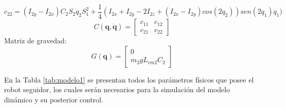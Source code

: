 \begin{equation}
    c_{22}=(I_{2y}-I_{2x} ) C_2 S_2 \Dot{q}_2 S_1^2+ \frac{1}{4} (I_{2x}+I_{2y}-2I_{2z}+(I_{2x}-I_{2y} )cos(2q_2 ) )sen(2q_1)\Dot{q}_1 )
\end{equation}
\begin{equation} \label{eq:modelo3}
    C(\textbf{q},\Dot{\textbf{q}})=
    \begin{bmatrix}
        c_{11} & c_{12} \\
        c_{21} & c_{22} 
    \end{bmatrix}
\end{equation}
Matriz de gravedad:
\begin{equation} \label{eq:modelo4}
    G(\textbf{q})=
    \begin{bmatrix}
        0 \\
        m_2 gL_{cm2} C_2 
    \end{bmatrix}
\end{equation}

En la Tabla \ref{tab:modelo1} se presentan todos los parámetros físicos que posee el robot seguidor, los cuales serán necesarios para la simulación del modelo dinámico y su posterior control.

